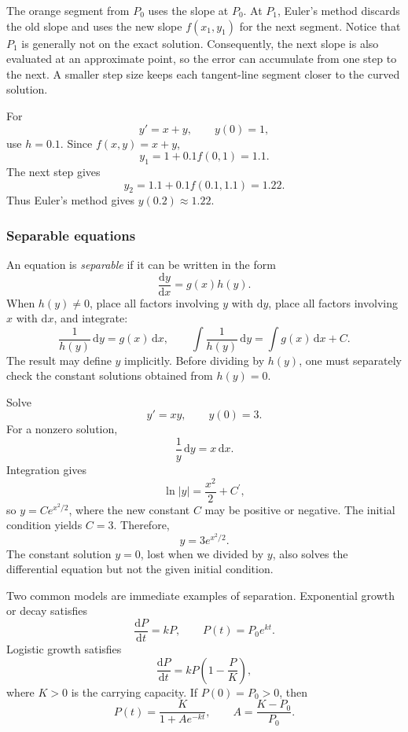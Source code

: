 The orange segment from \(P_0\) uses the slope at \(P_0\).  At \(P_1\),
Euler's method discards the old slope and uses the new slope
\(f(x_1,y_1)\) for the next segment.  Notice that \(P_1\) is generally not
on the exact solution.  Consequently, the next slope is also evaluated at
an approximate point, so the error can accumulate from one step to the
next.  A smaller step size keeps each tangent-line segment closer to the
curved solution.

\begin{eg}
    For
    \[
        y'=x+y,
        \qquad y(0)=1,
    \]
    use \(h=0.1\).  Since \(f(x,y)=x+y\),
    \[
        y_1=1+0.1f(0,1)=1.1.
    \]
    The next step gives
    \[
        y_2=1.1+0.1f(0.1,1.1)=1.22.
    \]
    Thus Euler's method gives \(y(0.2)\approx1.22\).
\end{eg}

\subsubsection{Separable equations}

An equation is \emph{separable} if it can be written in the form
\[
    \frac{\mathrm{d}y}{\mathrm{d}x}=g(x)h(y).
\]
When \(h(y)\neq0\), place all factors involving \(y\) with
\(\mathrm{d}y\), place all factors involving \(x\) with
\(\mathrm{d}x\), and integrate:
\[
    \frac{1}{h(y)}\,\mathrm{d}y=g(x)\,\mathrm{d}x,
    \qquad
    \int\frac{1}{h(y)}\,\mathrm{d}y
    =\int g(x)\,\mathrm{d}x+C.
\]
The result may define \(y\) implicitly.  Before dividing by \(h(y)\), one
must separately check the constant solutions obtained from \(h(y)=0\).

\begin{eg}
    Solve
    \[
        y'=xy,
        \qquad y(0)=3.
    \]
    For a nonzero solution,
    \[
        \frac{1}{y}\,\mathrm{d}y=x\,\mathrm{d}x.
    \]
    Integration gives
    \[
        \ln|y| = \frac{x^2}{2} + C^{\prime} ,
    \]
    so \(y=Ce^{x^2/2}\), where the new constant \(C\) may be positive or
    negative.  The initial condition yields \(C=3\).  Therefore,
    \[
        \boxed{y=3e^{x^2/2}}.
    \]
    The constant solution \(y=0\), lost when we divided by \(y\), also
    solves the differential equation but not the given initial condition.
\end{eg}

Two common models are immediate examples of separation.  Exponential
growth or decay satisfies
\[
    \frac{\mathrm{d}P}{\mathrm{d}t}=kP,
    \qquad
    P(t)=P_0e^{kt}.
\]
Logistic growth satisfies
\[
    \frac{\mathrm{d}P}{\mathrm{d}t}
    =kP\left(1-\frac{P}{K}\right),
\]
where \(K>0\) is the carrying capacity.  If \(P(0)=P_0>0\), then
\[
    P(t)=\frac{K}{1+Ae^{-kt}},
    \qquad
    A=\frac{K-P_0}{P_0}.
\]

